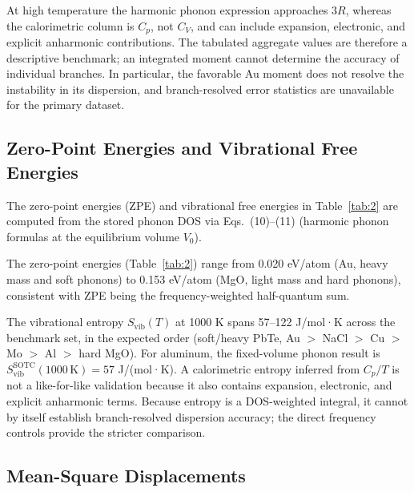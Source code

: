 \documentclass[aps,prb,reprint,amsmath,amssymb,floatfix]{revtex4-2}
\begin{document}
\color{revisionblue}
At high temperature the harmonic phonon expression approaches \(3R\), whereas
the calorimetric column is \(C_p\), not \(C_V\), and can include expansion,
electronic, and explicit anharmonic contributions. The tabulated aggregate values are therefore a descriptive benchmark;
an integrated moment cannot determine the accuracy of individual branches. In
particular, the favorable Au moment does not resolve the instability in its
dispersion, and branch-resolved error statistics are unavailable for the
primary dataset.
\color{black}

\subsection{Zero-Point Energies and Vibrational Free
Energies}\label{zero-point-energies-and-vibrational-free-energies}

\color{revisionblue}
The zero-point energies (ZPE) and vibrational free energies
in Table~\ref{tab:2} are computed from the stored phonon DOS via
Eqs.~(10)--(11) (harmonic phonon formulas at the equilibrium volume
\(V_0\)).
\color{black}

\color{revisionblue}
The zero-point energies (Table~\ref{tab:2}) range from 0.020 eV/atom (Au, heavy
mass and soft phonons) to 0.153 eV/atom (MgO, light mass and hard phonons),
consistent with ZPE being the frequency-weighted half-quantum sum.
\color{black}

\color{revisionblue}
The vibrational entropy \(S_\text{vib}(T)\) at 1000 K spans 57--122
J/mol·K across the benchmark set, in the expected order (soft/heavy
PbTe, Au \(>\) NaCl \(>\) Cu \(>\) Mo \(>\) Al \(>\) hard MgO). For aluminum,
the fixed-volume phonon result is
\(S_\text{vib}^\text{SOTC}(1000\,\text{K}) = 57\) J/(mol·K). A calorimetric
entropy inferred from \(C_p/T\) is not a like-for-like validation because it
also contains expansion, electronic, and explicit anharmonic terms. Because
entropy is a DOS-weighted integral, it cannot by itself establish
branch-resolved dispersion accuracy; the direct frequency controls provide the
stricter comparison.
\color{black}

\subsection{Mean-Square Displacements}\label{mean-square-displacements}
\end{document}
